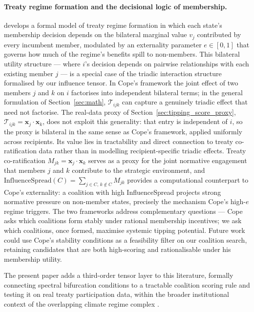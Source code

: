 \documentclass[11pt]{article}
\begin{document}
\paragraph{Treaty regime formation and the decisional logic of membership.}
\citet{cope2025decisional} develops a formal model of treaty regime formation in which each state's membership decision depends on the bilateral marginal value $v_j$ contributed by every incumbent member, modulated by an externality parameter $e \in [0,1]$ that governs how much of the regime's benefits spill to non-members. This bilateral utility structure --- where $i$'s decision depends on pairwise relationships with each existing member $j$ --- is a special case of the triadic interaction structure formalised by our influence tensor. In Cope's framework the joint effect of two members $j$ and $k$ on $i$ factorises into independent bilateral terms; in the general formulation of Section~\ref{sec:math}, $\mathcal{T}_{ijk}$ can capture a genuinely triadic effect that need not factorise. The real-data proxy of Section~\ref{sec:tipping_score_proxy}, $\mathcal{T}_{ijk} = \mathbf{x}_j \cdot \mathbf{x}_k$, does not exploit this generality: that entry is independent of $i$, so the proxy is bilateral in the same sense as Cope's framework, applied uniformly across recipients. Its value lies in tractability and direct connection to treaty co-ratification data rather than in modelling recipient-specific triadic effects. Treaty co-ratification $M_{jk} = \mathbf{x}_j \cdot \mathbf{x}_k$ serves as a proxy for the joint normative engagement that members $j$ and $k$ contribute to the strategic environment, and $\mathrm{InfluenceSpread}(C) = \sum_{j \in C,\, k \notin C} M_{jk}$ provides a computational counterpart to Cope's externality: a coalition with high InfluenceSpread projects strong normative pressure on non-member states, precisely the mechanism Cope's high-$e$ regime triggers. The two frameworks address complementary questions --- Cope asks which coalitions form stably under rational membership incentives; we ask which coalitions, once formed, maximise systemic tipping potential. Future work could use Cope's stability conditions as a feasibility filter on our coalition search, retaining candidates that are both high-scoring and rationalisable under his membership utility.

The present paper adds a third-order tensor layer to this literature, formally connecting spectral bifurcation conditions to a tractable coalition scoring rule and testing it on real treaty participation data, within the broader institutional context of the overlapping climate regime complex \citep{keohane2011regime}.
\end{document}
